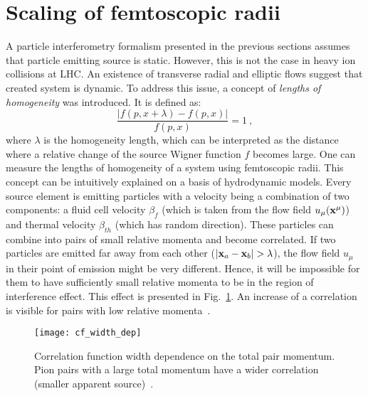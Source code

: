   \section{Scaling of femtoscopic radii}
  \label{sec:pi-scaling}
    A particle interferometry formalism presented in the previous sections assumes that particle emitting source is static.
    However, this is not the case in heavy ion collisions at LHC.
    An existence of transverse radial and elliptic flows suggest that created system is dynamic.
    To address this issue, a concept of \textit{lengths of homogeneity} was introduced.
    It is defined as:
    \begin{equation}
      \frac{|f(p,x + \lambda) - f(p,x)|}{f(p,x)} = 1~,
    \end{equation}
    where $\lambda$ is the homogeneity length, which can be interpreted as the distance where a relative change of the source Wigner function $f$ becomes large.
    One can measure the lengths of homogeneity of a system using femtoscopic radii.
    This concept can be intuitively explained on a basis of hydrodynamic models.
    Every source element is emitting particles with a velocity being a combination of two components: a fluid cell velocity $\beta_f$ (which is taken from the flow field $u_{\mu}(\mathbf{x^{\mu}})$) and thermal velocity $\beta_{th}$ (which has random direction).
    These particles can combine into pairs of small relative momenta and become correlated.
    If two particles are emitted far away from each other ($|\mathbf{x}_a - \mathbf{x}_b| > \lambda$), the flow field $u_\mu$ in their point of emission might be very different.
    Hence, it will be impossible for them to have sufficiently small relative momenta to be in the region of interference effect.
    This effect is presented in Fig.~\ref{fig:cf_width}.
    An increase of a correlation is visible for pairs with low relative momenta~\cite{drkisiel}.
    \begin{figure}[h]
      \centering
      \texttt{[image: cf\_width\_dep]}
      \caption{Correlation function width dependence on the total pair momentum. Pion pairs with a large total momentum have a wider correlation (smaller apparent source)~\cite{pratt_pion}.}
      \label{fig:cf_width}
    \end{figure}
